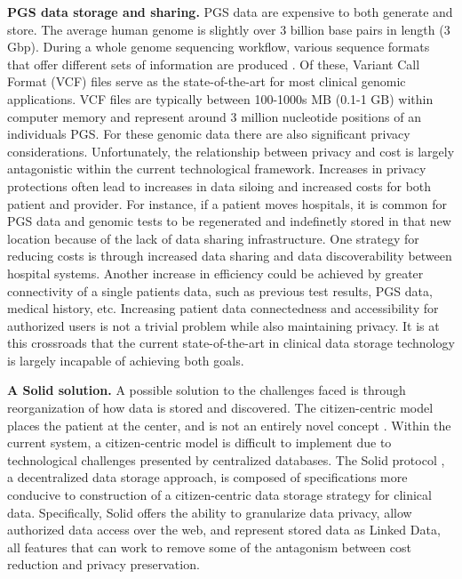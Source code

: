\documentclass[runningheads]{llncs}
\begin{document}
\textbf{PGS data storage and sharing.} 
PGS data are expensive to both generate and store. 
The average human genome is slightly over 3 billion base pairs in length (3 Gbp). 
During a whole genome sequencing workflow, various sequence formats that offer different sets of information are produced \cite{bagger_whole_2024}.
Of these, Variant Call Format (VCF) files \cite{danecek_variant_2011} serve as the state-of-the-art for most clinical genomic applications.
VCF files are typically between 100-1000s MB (0.1-1 GB) within computer memory and represent around 3 million nucleotide positions of an individual\textquotesingle s PGS.
For these genomic data there are also significant privacy considerations.
Unfortunately, the relationship between privacy and cost is largely antagonistic within the current technological framework.
Increases in privacy protections often lead to increases in data siloing and increased costs for both patient and provider.
For instance, if a patient moves hospitals, it is common for PGS data and genomic tests to be regenerated and indefinetly stored in that new location because of the lack of data sharing infrastructure.
One strategy for reducing costs is through increased data sharing and data discoverability between hospital systems.
Another increase in efficiency could be achieved by greater connectivity of a single patient\textquotesingle s data, such as previous test results, PGS data, medical history, etc.
Increasing patient data connectedness and accessibility for authorized users is not a trivial problem while also maintaining privacy.
It is at this crossroads that the current state-of-the-art in clinical data storage technology is largely incapable of achieving both goals.

\textbf{A Solid solution.} 
A possible solution to the challenges faced is through reorganization of how data is stored and discovered. 
The citizen-centric model places the patient at the center, and is not an entirely novel concept \cite{brands_patient-centered_2022}.
Within the current system, a citizen-centric model is difficult to implement due to technological challenges presented by centralized databases.
The Solid protocol \cite{capadisli_solid_nodate}, a decentralized data storage approach, is composed of specifications more conducive to construction of a citizen-centric data storage strategy for clinical data.
Specifically, Solid offers the ability to granularize data privacy, allow authorized data access over the web, and represent stored data as Linked Data, all features that can work to remove some of the antagonism between cost reduction and privacy preservation.
\end{document}
